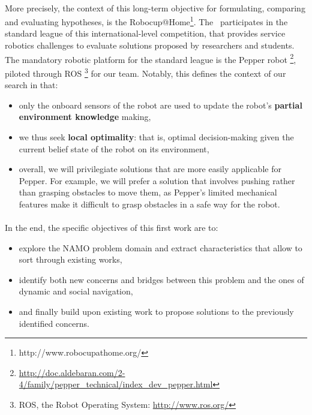 \paragraph{} More precisely, the context of this long-term objective for formulating, comparing and evaluating hypotheses, is the Robocup@Home\footnote{http://www.robocupathome.org/}. The \groupname \, participates in the standard league of this international-level competition, that provides service robotics challenges to evaluate solutions proposed by researchers and students. The mandatory robotic platform for the standard league is the Pepper robot \footnote{\url{http://doc.aldebaran.com/2-4/family/pepper_technical/index_dev_pepper.html}}, piloted through ROS \footnote{ROS, the Robot Operating System: \url{http://www.ros.org/}} for our team. Notably, this defines the context of our search in that:
\begin{itemize}
  \item only the onboard sensors of the robot are used to update the robot's \textbf{partial environment knowledge} making,
  \item we thus seek \textbf{local optimality}: that is, optimal decision-making given the current belief state of the robot on its environment,
  \item overall, we will privilegiate solutions that are more easily applicable for Pepper. For example, we will prefer a solution that involves pushing rather than grasping obstacles to move them, as Pepper's limited mechanical features make it difficult to grasp obstacles in a safe way for the robot.
\end{itemize}

\paragraph{} In the end, the specific objectives of this first work are to:
\begin{itemize}
  \item explore the NAMO problem domain and extract characteristics that allow to sort through existing works,
  \item identify both new concerns and bridges between this problem and the ones of dynamic and social navigation,
  \item and finally build upon existing work to propose solutions to the previously identified concerns.
\end{itemize}

\clearpage

